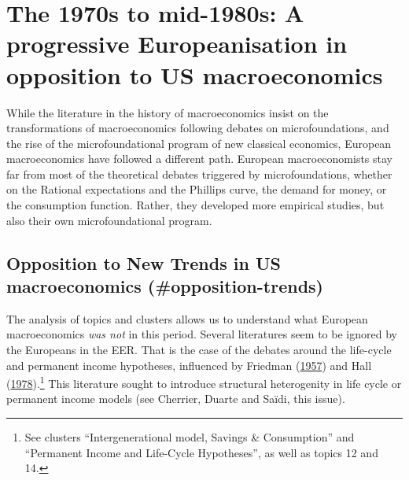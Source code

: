 \documentclass[
  12pt,
  onecolumn]{article}
\begin{document}
\hypertarget{the-1970s-to-mid-1980s-a-progressive-europeanisation-in-opposition-to-us-macroeconomics}{%
\section{The 1970s to mid-1980s: A progressive Europeanisation in
opposition to US
macroeconomics}\label{the-1970s-to-mid-1980s-a-progressive-europeanisation-in-opposition-to-us-macroeconomics}}

While the literature in the history of macroeconomics insist on the
transformations of macroeconomics following debates on microfoundations,
and the rise of the microfoundational program of new classical
economics, European macroeconomics have followed a different path.
European macroeconomists stay far from most of the theoretical debates
triggered by microfoundations, whether on the Rational expectations and
the Phillips curve, the demand for money, or the consumption function.
Rather, they developed more empirical studies, but also their own
microfoundational program.

\hypertarget{opposition-to-new-trends-in-us-macroeconomics-opposition-trends}{%
\subsection{Opposition to New Trends in US macroeconomics
(\#opposition-trends)}\label{opposition-to-new-trends-in-us-macroeconomics-opposition-trends}}

The analysis of topics and clusters allows us to understand what
European macroeconomics \emph{was not} in this period. Several
literatures seem to be ignored by the Europeans in the EER. That is the
case of the debates around the life-cycle and permanent income
hypotheses, influenced by Friedman
(\protect\hyperlink{ref-friedman1957}{1957}) and Hall
(\protect\hyperlink{ref-hall1978b}{1978}).\footnote{See clusters
  ``Intergenerational model, Savings \& Consumption'' and ``Permanent
  Income and Life-Cycle Hypotheses'', as well as topics 12 and 14.} This
literature sought to introduce structural heterogenity in life cycle or
permanent income models (see Cherrier, Duarte and Saïdi, this issue).
\end{document}

